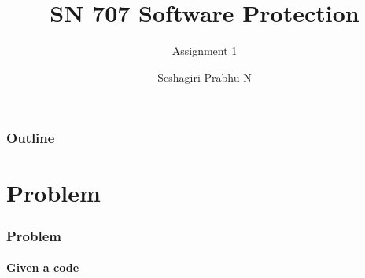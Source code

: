 \documentclass[12pt]{beamer}
\title{SN 707 Software Protection}
\subtitle{Assignment 1}
\author{Seshagiri Prabhu N}
\institute[Amrita Vishwa Vidyapeetham] %
{
  \begin{center}
    \tiny \textbf{AM.EN.P2CSN12028} \\ 
    M.Tech, Cyber Security and Networks\\
  	Amrita School of Engineering,
	Amritapuri Campus
  \end{center}  
}
\begin{document}
\frame{\titlepage}


\begin{frame}
  \frametitle{Outline}
  \tableofcontents[section=1,hidesubsections]
\end{frame}

\newcommand{\icon}[1]{\pgfimage[height=1em]{#1}}


\section{Problem}
\begin{frame}
	\frametitle{Problem}
	\framesubtitle{Given a code}
	\begin{figure}[htp] 
	\end{figure}
\end{frame}
\end{document}
